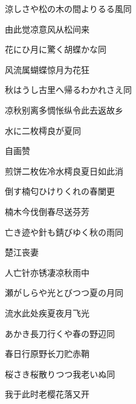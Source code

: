 \begin{haiku}
    {\FH 涼しさや松の木の間よりるる風}\hfill{\FH 同}

    {\FK 由此觉凉意风从松间来}
\end{haiku}

\begin{haiku}
    {\FH 花にひ月に驚く胡蝶かな}\hfill{\FH 同}

    {\FK 风流属蝴蝶惊月为花狂}
\end{haiku}

\begin{haiku}
    {\FH 秋はうし古里へ帰るわかれさえ}\hfill{\FH 同}

    {\FK 凉秋别离多惆怅纵令此去返故乡}
\end{haiku}

\begin{haiku}
    {\FH {}水に二枚樗良が夏}\hfill{\FH 同}

    {\FK 自画赞}

    {\FK 煎饼二枚佐冷水樗良夏日如此消}
\end{haiku}

\begin{haiku}
    {\FH {}倒す楠匂ひけりくれの春}\hfill{\FH 闌更}

    {\FK 楠木今伐倒春尽送芬芳}
\end{haiku}

\begin{haiku}
    {\FH 亡き迹や針も錆びゆく秋の雨}\hfill{\FH 同}

    {\FK 楚江丧妻}

    {\FK 人亡针亦锈凄凉秋雨中}
\end{haiku}

\begin{haiku}
    {\FH 瀬がしらや光とびつつ夏の月}\hfill{\FH 同}

    {\FK 流水此处疾夏夜月飞光}
\end{haiku}

\begin{haiku}
    {\FH {}あかき長刀行くや春の野辺}\hfill{\FH 同}

    {\FK 春日行原野长刀贮赤鞘}
\end{haiku}

\begin{haiku}
    {\FH 桜さき桜散りつつ我老いぬ}\hfill{\FH 同}

    {\FK 我于此时老樱花落又开}
\end{haiku}


